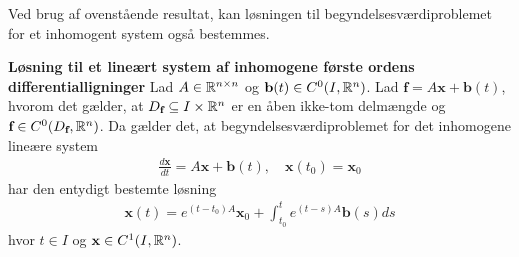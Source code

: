 Ved brug af ovenstående resultat, kan løsningen til begyndelsesværdiproblemet for et inhomogent system også bestemmes. 

\begin{minipage}\textwidth
\begin{thmx} \textbf{Løsning til et lineært system af inhomogene første ordens differentialligninger} \label{sæt:løsning_til_inhomogen_system}%
\newline
Lad $A \in \mathbb{R}^{n \times n}$ og $\mathbf{b}(t) \in C^0(I,\mathbb{R}^n)$. Lad $\textbf{f} = A\textbf{x}+\textbf{b}(t)$, hvorom det gælder, at $D_\textbf{f} \subseteq I\times \mathbb{R}^n$ er en åben ikke-tom delmængde og $\textbf{f} \in C^0(D_\textbf{f}, \mathbb{R}^n)$. Da gælder det, at begyndelsesværdiproblemet for det inhomogene lineære system 
\begin{align}\label{eq:inhomogen_lineart_system}
    \frac{d\textbf{x}}{dt} = A\textbf{x}+\textbf{b}(t), \quad \mathbf{x}(t_0) = \mathbf{x}_0 
\end{align}
har den entydigt bestemte løsning 
\begin{align}\label{eq:løsning_til_inhomogen_lineart_system}
    \textbf{x}(t) = e^{(t-t_0)A}\textbf{x}_0 + \int_{t_0}^t e^{(t-s)A}\textbf{b}(s) ds
\end{align}
hvor $t\in I$ og $\textbf{x} \in C^1(I, \mathbb{R}^n)$.
\end{thmx}
\end{minipage}

